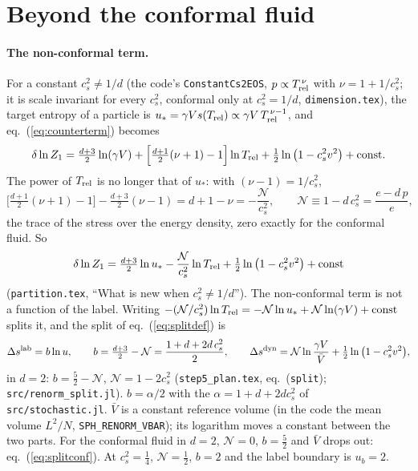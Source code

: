 \documentclass[11pt,aps,preprint,nofootinbib,superscriptaddress,tightenlines]{revtex4-2}
\def\st{\begin{equation}}
\def\stp{\end{equation}}
\def\Eq#1{eq.~(\ref{#1})}
\let\oldparagraph\paragraph
\renewcommand{\paragraph}{\par\bigskip\oldparagraph}
\begin{document}
\section{Beyond the conformal fluid}
\label{sec:general}

\paragraph{The non-conformal term.}  For a constant $c_s^2\neq1/d$ (the code's \texttt{ConstantCs2EOS}, $p\propto T_{\rm rel}^{\,\nu}$ with $\nu=1+1/c_s^2$; it
is scale invariant for every $c_s^2$, conformal only at $c_s^2=1/d$, \nolinkurl{dimension.tex}), the target entropy of a particle is
$u_*=\gamma Vs(T_{\rm rel})\propto\gamma V\,T_{\rm rel}^{\,\nu-1}$, and \Eq{eq:counterterm} becomes
\st
\delta\ln Z_1=\tfrac{d+3}2\ln(\gamma V)+\Big[\tfrac{d+1}2(\nu+1)-1\Big]\ln T_{\rm rel}+\tfrac12\ln\big(1-c_s^2v^2\big)+{\rm const} .
\stp
The power of $T_{\rm rel}$ is no longer that of $u_*$: with $(\nu-1)=1/c_s^2$,
\st
\Big[\tfrac{d+1}2(\nu+1)-1\Big]-\tfrac{d+3}2(\nu-1)=d+1-\nu=-\frac{\mathcal N}{c_s^2},\qquad \mathcal N\equiv1-d\,c_s^2=\frac{e-d\,p}{e} ,
\label{eq:N}
\stp
the trace of the stress over the energy density, zero exactly for the conformal fluid.  So
\st
\delta\ln Z_1=\tfrac{d+3}2\ln u_*-\frac{\mathcal N}{c_s^2}\ln T_{\rm rel}+\tfrac12\ln\big(1-c_s^2v^2\big)+{\rm const}
\stp
(\nolinkurl{partition.tex}, ``What is new when $c_s^2\neq1/d$'').  The non-conformal term is not a function of the label.  Writing
$-(\mathcal N/c_s^2)\ln T_{\rm rel}=-\mathcal N\ln u_*+\mathcal N\ln(\gamma V)+{\rm const}$ splits it, and the split of \Eq{eq:splitdef} is
\st
\Delta s^{\rm lab}=b\ln u,\qquad b=\tfrac{d+3}2-\mathcal N=\frac{1+d+2d\,c_s^2}{2},\qquad
\Delta s^{\rm dyn}=\mathcal N\ln\frac{\gamma V}{\bar V}+\tfrac12\ln\big(1-c_s^2v^2\big) ,
\label{eq:splitgen}
\stp
in $d=2$: $b=\tfrac52-\mathcal N$, $\mathcal N=1-2c_s^2$ (\nolinkurl{step5_plan.tex}, eq.~(\texttt{split}); \nolinkurl{src/renorm_split.jl}).  $b=\alpha/2$ with the
$\alpha=1+d+2dc_s^2$ of \nolinkurl{src/stochastic.jl}.  $\bar V$ is a constant reference volume (in the code the mean volume $L^2/N$,
\texttt{SPH\_RENORM\_VBAR}); its logarithm moves a constant between the two parts.  For the conformal fluid in $d=2$, $\mathcal N=0$, $b=\tfrac52$ and
$\bar V$ drops out: \Eq{eq:splitconf}.  At $c_s^2=\tfrac14$, $\mathcal N=\tfrac12$, $b=2$ and the label boundary is $u_b=2$.
\end{document}
